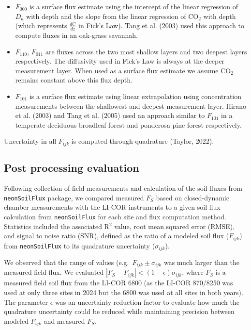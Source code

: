 \documentclass[
  letterpaper,
  DIV=11,
  numbers=noendperiod]{scrartcl}
\providecommand{\tightlist}{%
  \setlength{\itemsep}{0pt}\setlength{\parskip}{0pt}}\usepackage{longtable,booktabs,array}
\begin{document}
\begin{itemize}
\tightlist
\item
  \(F_{000}\) is a surface flux estimate using the intercept of the
  linear regression of \(D_{a}\) with depth and the slope from the
  linear regression of CO\(_{2}\) with depth (which represents
  \(\displaystyle \frac{dC}{dz}\) in Fick's Law). Tang et al. (2003)
  used this approach to compute fluxes in an oak-grass savannah.
\item
  \(F_{110}\), \(F_{011}\) are fluxes across the two most shallow layers
  and two deepest layers respectively. The diffusivity used in Fick's
  Law is always at the deeper measurement layer. When used as a surface
  flux estimate we assume CO\(_{2}\) remains constant above this flux
  depth.
\item
  \(F_{101}\) is a surface flux estimate using linear extrapolation
  using concentration measurements between the shallowest and deepest
  measurement layer. Hirano et al. (2003) and Tang et al. (2005) used an
  approach similar to \(F_{101}\) in a temperate deciduous broadleaf
  forest and ponderosa pine forest respectively.
\end{itemize}

Uncertainty in all \(F_{ijk}\) is computed through quadrature (Taylor,
2022).

\subsection{Post processing evaluation}\label{sec-post-process}

Following collection of field measurements and calculation of the soil
fluxes from \texttt{neonSoilFlux} package, we compared measured
\(F_{S}\) based on closed-dynamic chamber measurements with the LI-COR
instruments to a given soil flux calculation from \texttt{neonSoilFlux}
for each site and flux computation method. Statistics included the
associated R\(^{2}\) value, root mean squared error (RMSE), and signal
to noise ratio (SNR), defined as the ratio of a modeled soil flux
(\(F_{ijk}\)) from \texttt{neonSoilFlux} to its quadrature uncertainty
(\(\sigma_{ijk}\)).

We observed that the range of values (e.g.~\(F_{ijk} \pm \sigma_{ijk}\)
was much larger than the measured field flux. We evaluated
\(| F_{S} - F_{ijk} | < (1-\epsilon) \sigma_{ijk}\), where \(F_{S}\) is
a measured field soil flux from the LI-COR 6800 (as the LI-COR 870/8250
was used at only three sites in 2024 but the 6800 was used at all sites
in both years). The parameter \(\epsilon\) was an uncertainty reduction
factor to evaluate how much the quadrature uncertainty could be reduced
while maintaining precision between modeled \(F_{ijk}\) and measured
\(F_{S}\).
\end{document}
